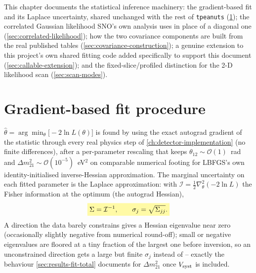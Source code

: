 \label{ch:inference-process}

This chapter documents the statistical inference machinery: the
gradient-based fit and its Laplace uncertainty, shared unchanged with the
rest of \texttt{tpeanuts} (\cref{sec:fit-procedure}); the correlated
Gaussian likelihood SNO's own analysis uses in place of a diagonal one
(\cref{sec:correlated-likelihood}); how the two covariance components are
built from the real published tables (\cref{sec:covariance-construction});
a genuine extension to this project's own shared fitting code added
specifically to support this document (\cref{sec:callable-extension}); and
the fixed-slice/profiled distinction for the 2-D likelihood scan
(\cref{sec:scan-modes}).

\section{Gradient-based fit procedure}
\label{sec:fit-procedure}


\begin{theorybox}
$\hat\theta=\arg\min_\theta\bigl[-2\ln L(\theta)\bigr]$ is found by
 using the exact autograd gradient of the
statistic through every real physics step of
\cref{ch:detector-implementation} (no finite differences), after a
per-parameter rescaling that keeps $\theta_{12}\sim\mathcal O(1)$~rad and
$\Delta m^2_{21}\sim\mathcal O(10^{-5})$~eV$^2$ on comparable numerical
footing for LBFGS's own identity-initialised inverse-Hessian
approximation. The marginal uncertainty on each fitted parameter is the
Laplace approximation: with $\mathcal I=\tfrac12\nabla^2_\theta(-2\ln L)$
the Fisher information at the optimum (the autograd Hessian),
\begin{equation}
  \keyresult{\Sigma = \mathcal I^{-1}, \qquad \sigma_j = \sqrt{\Sigma_{jj}}.}
  \label{eq:laplace-covariance}
\end{equation}
A direction the data barely constrains gives a Hessian eigenvalue near
zero (occasionally slightly negative from numerical round-off); small or
negative eigenvalues are floored at a tiny fraction of the largest one
before inversion, so an unconstrained direction gets a large but finite
$\sigma_j$ instead of  -- exactly the behaviour
\cref{sec:results-fit-total} documents for $\Delta m^2_{21}$ once
$V_{\rm syst}$ is included.
\end{theorybox}

